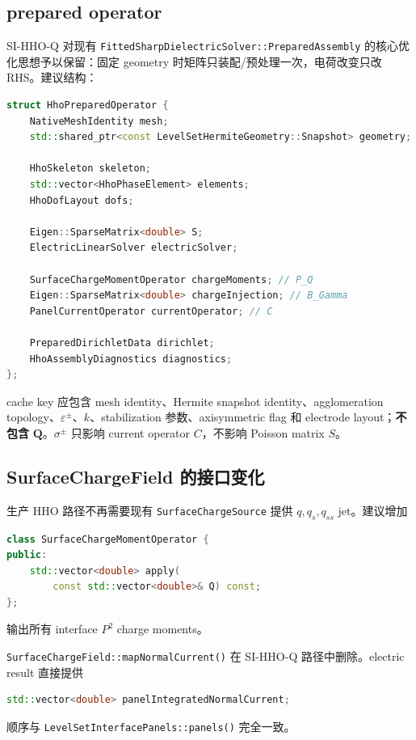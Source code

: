 \documentclass[UTF8,a4paper,11pt]{ctexart}
\newcommand{\eps}{\varepsilon}
\newcommand{\vct}[1]{\bm{#1}}
\begin{document}
\subsection{prepared operator}

SI-HHO-Q 对现有 \texttt{FittedSharpDielectricSolver::PreparedAssembly} 的核心优化思想予以保留：固定 geometry 时矩阵只装配/预处理一次，电荷改变只改 RHS。建议结构：
\begin{lstlisting}[language=C++]
struct HhoPreparedOperator {
    NativeMeshIdentity mesh;
    std::shared_ptr<const LevelSetHermiteGeometry::Snapshot> geometry;

    HhoSkeleton skeleton;
    std::vector<HhoPhaseElement> elements;
    HhoDofLayout dofs;

    Eigen::SparseMatrix<double> S;
    ElectricLinearSolver electricSolver;

    SurfaceChargeMomentOperator chargeMoments; // P_Q
    Eigen::SparseMatrix<double> chargeInjection; // B_Gamma
    PanelCurrentOperator currentOperator; // C

    PreparedDirichletData dirichlet;
    HhoAssemblyDiagnostics diagnostics;
};
\end{lstlisting}

cache key 应包含 mesh identity、Hermite snapshot identity、agglomeration topology、\(\eps^\pm\)、\(k\)、stabilization 参数、axisymmetric flag 和 electrode layout；\textbf{不包含} \(\vct Q\)。\(\sigma^\pm\) 只影响 current operator \(C\)，不影响 Poisson matrix \(S\)。

\subsection{SurfaceChargeField 的接口变化}

生产 HHO 路径不再需要现有 \texttt{SurfaceChargeSource} 提供 \(q,q_s,q_{ss}\) jet。建议增加
\begin{lstlisting}[language=C++]
class SurfaceChargeMomentOperator {
public:
    std::vector<double> apply(
        const std::vector<double>& Q) const;
};
\end{lstlisting}
输出所有 interface \(P^2\) charge moments。

\texttt{SurfaceChargeField::mapNormalCurrent()} 在 SI-HHO-Q 路径中删除。electric result 直接提供
\begin{lstlisting}[language=C++]
std::vector<double> panelIntegratedNormalCurrent;
\end{lstlisting}
顺序与 \texttt{LevelSetInterfacePanels::panels()} 完全一致。
\end{document}
